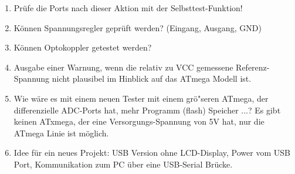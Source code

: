 \begin{enumerate}
\item Pr\"ufe die Ports nach dieser Aktion mit der Selbsttest-Funktion!
\item K\"onnen Spannungsregler gepr\"uft werden? (Eingang, Ausgang, GND)
\item K\"onnen Optokoppler getestet werden?
\item Ausgabe einer Warnung, wenn die relativ zu VCC gemessene Referenz-Spannung nicht plausibel im Hinblick auf das ATmega Modell ist.
\item Wie w\"are es mit einem neuen Tester mit einem gr\"o"seren ATmega, der differenzielle ADC-Ports hat,
mehr Programm (flash) Speicher ...?
Es gibt keinen ATxmega, der eine Versorgungs-Spannung von 5V hat, nur die ATmega Linie ist m\"oglich.
\item Idee f\"ur ein neues Projekt: USB  Version ohne LCD-Display, Power vom USB Port, Kommunikation zum PC \"uber eine USB-Serial Br\"ucke.
\end{enumerate}
